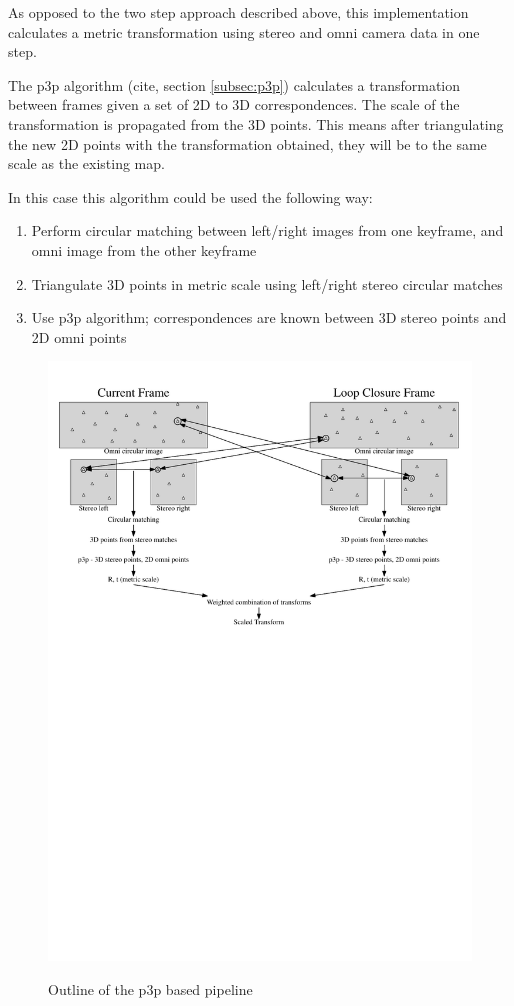 As opposed to the two step approach described above, this implementation calculates a metric transformation using stereo and omni camera data in one step.

The p3p algorithm (cite, section \ref{subsec:p3p}) calculates a transformation between frames given a set of 2D to 3D correspondences.  The scale of the transformation is propagated from the 3D points.  This means after triangulating the new 2D points with the transformation obtained, they will be to the same scale as the existing map.

In this case this algorithm could be used the following way:

\begin{enumerate}
\itemsep0em
 \item Perform circular matching between left/right images from one keyframe, and omni image from the other keyframe
 \item Triangulate 3D points in metric scale using left/right stereo circular matches
 \item Use p3p algorithm; correspondences are known between 3D stereo points and 2D omni points
\end{enumerate}

\begin{figure}[H]
  \centering
    \includegraphics[width=1.0\textwidth]{chapters/images/6_images_p3p}\\
  \caption{Outline of the p3p based pipeline}
  \label{fig:p3p_flowchart}
\end{figure}

